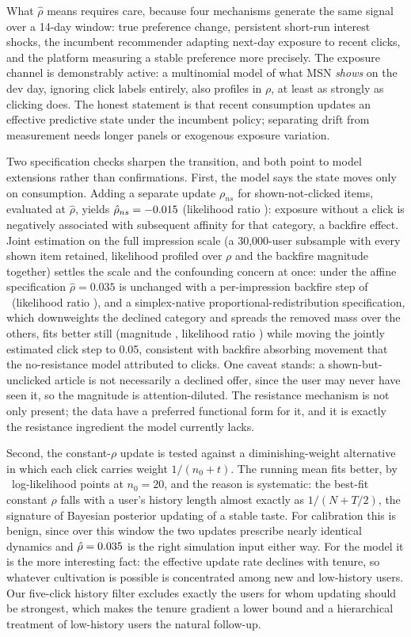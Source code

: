 \documentclass[11pt]{article}
\begin{document}
What $\hat\rho$ means requires care, because four mechanisms generate the
same signal over a 14-day window: true preference change, persistent
short-run interest shocks, the incumbent recommender adapting next-day
exposure to recent clicks, and the platform measuring a stable preference
more precisely. The exposure channel is demonstrably active: a multinomial
model of what MSN \emph{shows} on the dev day, ignoring click labels
entirely, also profiles in $\rho$, at least as strongly as clicking does.
The honest statement is that recent consumption updates an effective
predictive state under the incumbent policy; separating drift from
measurement needs longer panels or exogenous exposure variation.

Two specification checks sharpen the transition, and both point to model
extensions rather than confirmations. First, the model says the state moves
only on consumption. Adding a separate update $\rho_{ns}$ for
shown-not-clicked items, evaluated at $\hat\rho$, yields
$\hat\rho_{ns}=-0.015$ (likelihood ratio \LRns): exposure without a click
is negatively associated with subsequent affinity for that category, a
backfire effect. Joint estimation on the full impression scale (a
30{,}000-user subsample with every shown item retained, likelihood
profiled over $\rho$ and the backfire magnitude together) settles the
scale and the confounding concern at once: under the affine specification
$\hat\rho=0.035$ is unchanged with a per-impression backfire step of
\bjmagaff\ (likelihood ratio \bjLRaff), and a simplex-native
proportional-redistribution specification, which downweights the
declined category and spreads the removed mass over the others, fits
better still (magnitude \bjmagprop, likelihood ratio \bjLRprop) while
moving the jointly estimated click step to 0.05, consistent with
backfire absorbing movement that the no-resistance model attributed to
clicks. One caveat stands: a shown-but-unclicked article is not
necessarily a declined offer, since the user may never have seen it, so
the magnitude is attention-diluted. The resistance mechanism is not only
present; the data have a preferred functional form for it, and it is
exactly the resistance ingredient the model currently lacks.

Second, the constant-$\rho$ update is tested against a diminishing-weight
alternative in which each click carries weight $1/(n_0+t)$. The running
mean fits better, by \runmeandelta\ log-likelihood points at $n_0=20$, and
the reason is systematic: the best-fit constant $\rho$ falls with a user's
history length almost exactly as $1/(N+T/2)$, the signature of Bayesian
posterior updating of a stable taste. For calibration this is benign, since
over this window the two updates prescribe nearly identical dynamics and
$\hat\rho=0.035$ is the right simulation input either way. For the model
it is the more interesting fact: the effective update rate declines with
tenure, so whatever cultivation is possible is concentrated among new and
low-history users. Our five-click history filter excludes exactly the users
for whom updating should be strongest, which makes the tenure gradient a
lower bound and a hierarchical treatment of low-history users the natural
follow-up.
\end{document}
